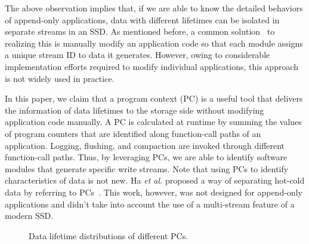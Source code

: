The above observation implies that, if we are able to know the detailed
behaviors of append-only applications, data with different lifetimes can be
isolated in separate streams in an SSD. As mentioned before, a common
solution~\cite{MultiStream} to realizing this is manually modify an application
code so that each module assigns a unique stream ID to data it generates.
However, owing to considerable implementation efforts required to modify
individual applications, this approach is not widely used in practice.

In this paper, we claim that a program context (PC) is a useful tool that delivers
the information of data lifetimes to the storage side without modifying
application code manually. A PC is calculated at runtime by
summing the values of program counters that are identified along function-call
paths of an application. Logging, flushing, and compaction are invoked through
different function-call paths. Thus, by leveraging PCs, we are
able to identify software modules that generate specific write streams. Note
that using PCs to identify characteristics of data is not new.
Ha \textit{et al.} proposed a way of separating hot-cold data by referring to
PCs~\cite{PCHa}. This work, however, was not designed for
append-only applications and didn't take into account the use of a multi-stream
feature of a modern SSD.

\begin{figure}[!t]
\centering
\vspace{-10pt}
\hspace{1pt}
\hfill
\vspace{-10pt}
\caption{Data lifetime distributions of different PCs.} 
\label{fig:types_and_PCs}
\vspace{-15pt}
\end{figure}

